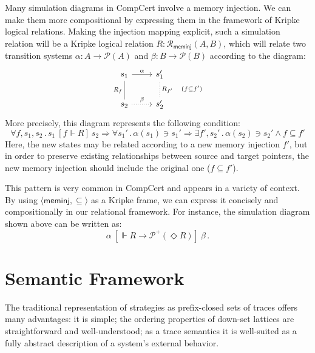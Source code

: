 \documentclass[acmsmall,timestamp,review]{acmart}
\newcommand{\kw}[1]{\ensuremath{ \mathsf{#1} }}
\newcommand{\ifr}[1]{\ [{#1}]\ }
\begin{document}
\begin{example} \label{ex:sim} %
Many simulation diagrams in CompCert
involve a memory injection.
We can make them more compositional by
expressing them in the framework of Kripke logical relations.
Making the injection mapping explicit,
such a simulation relation will be a Kripke logical relation
$R : \mathcal{R}_\kw{meminj}(A, B)$,
which will relate two transition systems
$\alpha : A \rightarrow \mathcal{P}(A)$ and
$\beta : B \rightarrow \mathcal{P}(B)$
according to the diagram:
\[
  \begin{tikzcd}
    s_1 \arrow[r, "\alpha"]
        \arrow[d, dash, "R_f"'] &
    s_1' \arrow[d, dotted, dash, "R_{f'} \quad (f \subseteq f')"] \\
    s_2 \arrow[r, dotted, "\beta"] &
    s_2'
  \end{tikzcd}
\]
More precisely, this diagram represents the following condition:
\[
    \forall f, s_1, s_2 \,.\, s_1 \ifr{f \Vdash R} s_2 \Rightarrow
    \forall s_1' \,.\, \alpha(s_1) \ni s_1' \Rightarrow
    \exists f', s_2' \,.\, \alpha(s_2) \ni s_2' \wedge f \subseteq f'
\]
Here, the new states may be related according to
a new memory injection $f'$,
but in order to preserve existing relationships
between source and target pointers,
the new memory injection should include
the original one ($f \subseteq f'$).

This pattern is very common in CompCert
and appears in a variety of context.
By using $\langle \kw{meminj}, {\subseteq} \rangle$
as a Kripke frame,
we can express it concisely and compositionally
in our relational framework.
For instance,
the simulation diagram shown above can be written as:
\[
  \alpha \ifr{\Vdash R \rightarrow \mathcal{P}^+(\Diamond R)} \beta \,.
\]
\end{example}



\section{Semantic Framework} \label{sec:monad} %


The traditional representation of strategies as
prefix-closed sets of traces
offers many advantages:
it is simple;
the ordering properties of down-set lattices
are straightforward and well-understood;
as a trace semantics
it is well-suited as a fully abstract description
of a system's external behavior.
\end{document}
